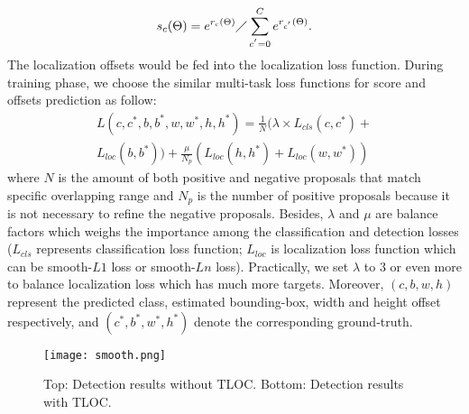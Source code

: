 \documentclass[10pt,twocolumn,letterpaper]{article}
\begin{document}
\begin{equation}\label{eq:softmax}
  s_{c}(\Theta) = e^{r_{c}(\Theta)}\diagup \sum\limits_{c^{'}=0}^{C}e^{r_{c^{'}}(\Theta)}.
\end{equation}
The localization offsets would be fed into the localization loss function. During training phase, we choose the similar multi-task loss functions for score and offsets prediction as follow:
\begin{equation}\label{eq:optimazation}
\begin{aligned}
  L(c,c^{*},b,b^{*},w,w^{*},h,h^{*}) = \frac{1}{N}(\lambda\times L_{cls}(c, c^{*}) + \\
  L_{loc}(b,b^{*})) + \frac{\mu}{N_{p}}(L_{loc}(h,h^{*}) + L_{loc}(w,w^{*}))
\end{aligned}
\end{equation}
where $N$ is the amount of both positive and negative proposals that match specific overlapping range and $N_{p}$ is the number of positive proposals because it is not necessary to refine the negative proposals. Besides, $\lambda$ and $\mu$ are balance factors which weighs the importance among the classification and detection losses ($L_{cls}$ represents classification loss function; $L_{loc}$ is localization loss function which can be smooth-$L1$ loss or smooth-$Ln$\cite{liu2017deep} loss). Practically, we set $\lambda$ to 3 or even more to balance localization loss which has much more targets. Moreover, $(c,b,w,h)$ represent the predicted class, estimated bounding-box, width and height offset respectively, and $(c^{*},b^{*},w^{*},h^{*})$ denote the corresponding ground-truth.

\begin{figure}[htb]
  \centering
  \centerline{\texttt{[image: smooth.png]}} \caption{Top: Detection results without TLOC. Bottom: Detection results with TLOC.}\label{fig:smooth}
\end{figure}
\end{document}
